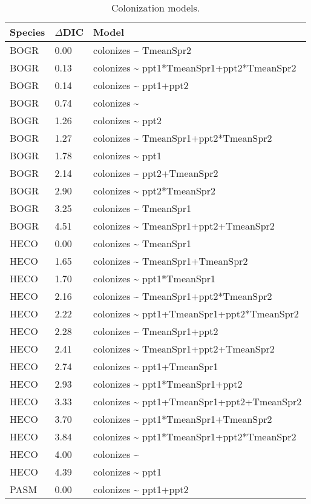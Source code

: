 \documentclass[10pt]{article}
\begin{document}
\begin{table}[ht]
\centering
\caption{Colonization models.} 
\begin{tabularx}{\textwidth}{llZ}
  \hline
Species & $\Delta$DIC & Model \\ 
  \hline
BOGR & 0.00 & colonizes \~{} TmeanSpr2 \\ 
  BOGR & 0.13 & colonizes \~{} ppt1*TmeanSpr1+ppt2*TmeanSpr2 \\ 
  BOGR & 0.14 & colonizes \~{} ppt1+ppt2 \\ 
  BOGR & 0.74 & colonizes \~{}  \\ 
  BOGR & 1.26 & colonizes \~{} ppt2 \\ 
  BOGR & 1.27 & colonizes \~{} TmeanSpr1+ppt2*TmeanSpr2 \\ 
  BOGR & 1.78 & colonizes \~{} ppt1 \\ 
  BOGR & 2.14 & colonizes \~{} ppt2+TmeanSpr2 \\ 
  BOGR & 2.90 & colonizes \~{} ppt2*TmeanSpr2 \\ 
  BOGR & 3.25 & colonizes \~{} TmeanSpr1 \\ 
  BOGR & 4.51 & colonizes \~{} TmeanSpr1+ppt2+TmeanSpr2 \\ 
  HECO & 0.00 & colonizes \~{} TmeanSpr1 \\ 
  HECO & 1.65 & colonizes \~{} TmeanSpr1+TmeanSpr2 \\ 
  HECO & 1.70 & colonizes \~{} ppt1*TmeanSpr1 \\ 
  HECO & 2.16 & colonizes \~{} TmeanSpr1+ppt2*TmeanSpr2 \\ 
  HECO & 2.22 & colonizes \~{} ppt1+TmeanSpr1+ppt2*TmeanSpr2 \\ 
  HECO & 2.28 & colonizes \~{} TmeanSpr1+ppt2 \\ 
  HECO & 2.41 & colonizes \~{} TmeanSpr1+ppt2+TmeanSpr2 \\ 
  HECO & 2.74 & colonizes \~{} ppt1+TmeanSpr1 \\ 
  HECO & 2.93 & colonizes \~{} ppt1*TmeanSpr1+ppt2 \\ 
  HECO & 3.33 & colonizes \~{} ppt1+TmeanSpr1+ppt2+TmeanSpr2 \\ 
  HECO & 3.70 & colonizes \~{} ppt1*TmeanSpr1+TmeanSpr2 \\ 
  HECO & 3.84 & colonizes \~{} ppt1*TmeanSpr1+ppt2*TmeanSpr2 \\ 
  HECO & 4.00 & colonizes \~{}  \\ 
  HECO & 4.39 & colonizes \~{} ppt1 \\ 
  PASM & 0.00 & colonizes \~{} ppt1+ppt2 \\ 

\end{tabularx}
\end{table}
\end{document}
